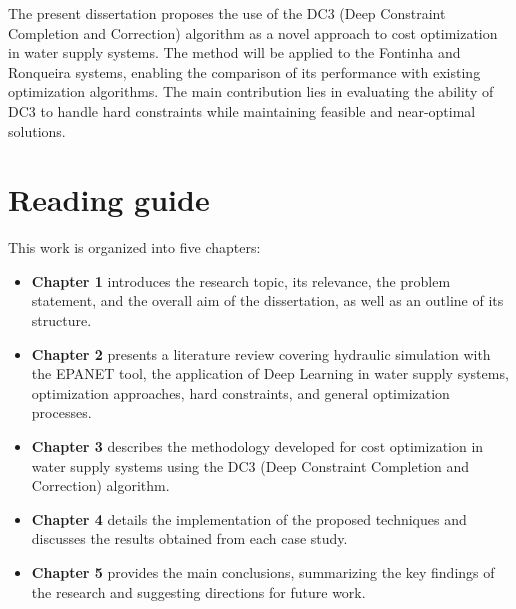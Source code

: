 The present dissertation proposes the use of the DC3 (Deep Constraint Completion and Correction) algorithm as a novel approach to cost optimization in water supply systems. The method will be applied to the Fontinha and Ronqueira systems, enabling the comparison of its performance with existing optimization algorithms. The main contribution lies in evaluating the ability of DC3 to handle hard constraints while maintaining feasible and near-optimal solutions.

\section{Reading guide}

This work is organized into five chapters:

\begin{itemize}
    \item \textbf{Chapter 1} introduces the research topic, its relevance, the problem statement, and the overall aim of the dissertation, as well as an outline of its structure.
    
    \item \textbf{Chapter 2} presents a literature review covering hydraulic simulation with the EPANET tool, the application of Deep Learning in water supply systems, optimization approaches, hard constraints, and general optimization processes.
    
    \item \textbf{Chapter 3} describes the methodology developed for cost optimization in water supply systems using the DC3 (Deep Constraint Completion and Correction) algorithm.
    
    \item \textbf{Chapter 4} details the implementation of the proposed techniques and discusses the results obtained from each case study.
    
    \item \textbf{Chapter 5} provides the main conclusions, summarizing the key findings of the research and suggesting directions for future work.
\end{itemize}
